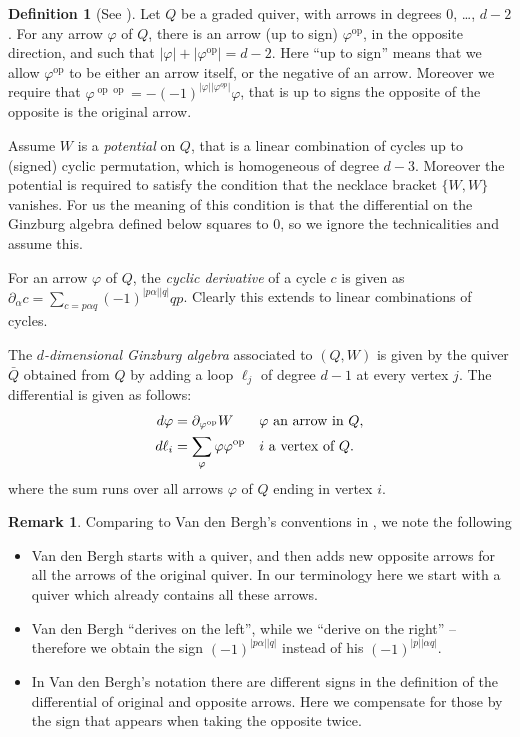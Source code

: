 \documentclass[a4paper,11pt]{amsart}
\theoremstyle{definition}
\newtheorem{definition}[theorem]{Definition}
\newtheorem{remark}[theorem]{Remark}
\DeclareMathOperator{\op}{op}
\numberwithin{theorem}{section}
\begin{document}
\begin{definition}[See \cite{van_den_bergh}] \label{def.higher_Ginzburg}
Let $Q$ be a graded quiver, with arrows in degrees $0$, \dots, $d-2$. For any arrow $\varphi$ of $Q$, there is an arrow (up to sign) $\varphi^{\op}$, in the opposite direction, and such that $| \varphi| + |\varphi^{\op}| = d - 2$. Here ``up to sign'' means that we allow $\varphi^{\op}$ to be either an arrow itself, or the negative of an arrow. Moreover we require that $\varphi^{\op \op} = - (-1)^{|\varphi| | \varphi^{op}|} \varphi$, that is up to signs the opposite of the opposite is the original arrow.

Assume $W$ is a \emph{potential} on $Q$, that is a linear combination of cycles up to (signed) cyclic permutation, which is homogeneous of degree $d-3$. Moreover the potential is required to satisfy the condition that the necklace bracket $\{ W, W \}$ vanishes. For us the meaning of this condition is that the differential on the Ginzburg algebra defined below squares to $0$, so we ignore the technicalities and assume this.

For an arrow $\varphi$ of $Q$, the \emph{cyclic derivative} of a cycle $c$ is given as $\partial_{\alpha} c = \sum_{c = p \alpha q} (-1)^{|p \alpha| |q |} qp$. Clearly this extends to linear combinations of cycles.

The \emph{$d$-dimensional Ginzburg algebra} associated to $(Q, W)$ is given by the quiver $\bar{Q}$ obtained from $Q$ by adding a loop $\ell_j$ of degree $d-1$ at every vertex $j$. The differential is given as follows:
\begin{align*}
d \varphi & = \partial_{\varphi^{\rm op}} W && \varphi \text{ an arrow in } Q, \\
d \ell_i & = \sum_{\varphi} \varphi \varphi^{\rm op} && i \text{ a vertex of } Q.
\end{align*}
where the sum runs over all arrows $\varphi$ of $Q$ ending in vertex $i$.
\end{definition}

\begin{remark} \label{rem.orig=opp}
Comparing to Van den Bergh's conventions in \cite[Section~10.3]{van_den_bergh}, we note the following
\begin{itemize}
\item Van den Bergh starts with a quiver, and then adds new opposite arrows for all the arrows of the original quiver. In our terminology here we start with a quiver which already contains all these arrows.
\item Van den Bergh ``derives on the left'', while we ``derive on the right'' -- therefore we obtain the sign $(-1)^{|p \alpha| |q |}$ instead of his  $(-1)^{|p| | \alpha q |}$.
\item In Van den Bergh's notation there are different signs in the definition of the differential of original and opposite arrows. Here we compensate for those by the sign that appears when taking the opposite twice. 
\end{itemize}
\end{remark}
\end{document}
